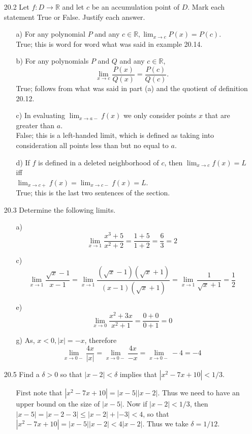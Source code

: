 \documentclass[12pt]{article}
\begin{document}
\begin{enumerate}
\item[20.2] Let $f: D \rightarrow \mathbb{R}$ and let $c$ be an accumulation point of $D$. Mark each statement True or False. Justify each answer.
\begin{enumerate}
\item[a)] For any polynomial $P$ and any $c \in \mathbb{R}, \lim_{x \to c}P(x) = P(c)$. \\
True; this is word for word what was said in example 20.14.
\item[b)] For any polynomials $P$ and $Q$ and any $c \in \mathbb{R}$,
\[
\lim_{x \to c}\frac{P(x)}{Q(x)} = \frac{P(c)}{Q(c)}.
\]
True; follows from what was said in part (a) and the quotient of
definition 20.12.
\item[c)] In evaluating $\lim_{x \to a-}f(x)$ we only consider points $x$ that are greater than $a$. \\
False; this is a left-handed limit, which is defined as 
taking into consideration all points less than but no equal to $a$.
\item[d)] If $f$ is defined in a deleted neighborhood of $c$, then $\lim_{x \to c}f(x) = L$ iff 
\\ $\lim_{x \to c+}f(x) = \lim_{x \to c-}f(x) = L$. \\
True; this is the last two sentences of the section.
\end{enumerate}

\item[20.3] Determine the following limits.
\begin{enumerate}
\item[a)]
\[
\lim_{x \to 1} \frac{x^3 + 5}{x^2 + 2} = \frac{1 + 5}{1 + 2} = \frac{6}{3} = 2
\]
\item[c)]
\[
\lim_{x \to 1} \frac{\sqrt{x} - 1}{x - 1} = 
\lim_{x \to 1} \frac{(\sqrt{x} - 1)(\sqrt{x} + 1)}{(x - 1)(\sqrt{x} + 1)} =
\lim_{x \to 1} \frac{1}{\sqrt{x} + 1} = \frac{1}{2}
\]
\item[e)]
\[
\lim_{x \to 0} \frac{x^2 + 3x}{x^2 + 1} = \frac{0 + 0}{0 + 1} = 0
\]
\item[g)] As, $x < 0, |x| = -x$, therefore
\[
\lim_{x \to 0-} \frac{4x}{|x|} = \lim_{x \to 0-} \frac{4x}{-x} = \lim_{x \to 0-} -4 = -4
\]
\end{enumerate}

\item[20.5] Find a $\delta > 0$ so that $|x - 2| < \delta$ implies that $|x^2 - 7x + 10| < 1/3$.
\begin{enumerate}
\item[] First note that $|x^2 - 7x + 10| = |x - 5||x - 2|$. Thus we need to have an upper
bound on the size of $|x - 5|$. Now if $|x - 2| < 1/3$, then 
$|x - 5| = |x - 2 - 3| \leq |x - 2| + |-3| < 4$, so that 
$|x^2 - 7x + 10| = |x - 5||x - 2| < 4|x - 2|$. Thus we take $\delta = 1/12$.
\end{enumerate}



\end{enumerate}
\end{document}
